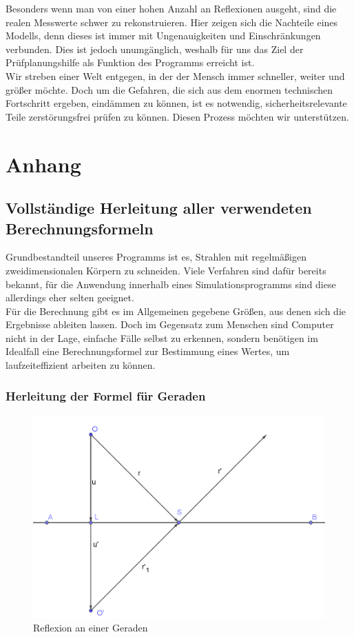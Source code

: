 \documentclass[reducespace,stylepage,semiarbeit]{spezidoc}
\begin{document}
Besonders wenn man von einer hohen Anzahl an Reflexionen ausgeht, sind die realen Messwerte schwer zu rekonstruieren.
Hier zeigen sich die Nachteile eines Modells, denn dieses ist immer mit Ungenauigkeiten und Einschränkungen verbunden.
Dies ist jedoch unumgänglich, weshalb für uns das Ziel der Prüfplanungshilfe als Funktion des Programms erreicht ist.\\ %
Wir streben einer Welt entgegen, in der der Mensch immer schneller, weiter und größer möchte. 
Doch um die Gefahren, die sich aus dem enormen technischen Fortschritt ergeben, eindämmen zu können, ist es notwendig, sicherheitsrelevante Teile zerstörungsfrei prüfen zu können.
Diesen Prozess möchten wir unterstützen.\\ %


\newpage
\section{Anhang}

\subsection{Vollständige Herleitung aller verwendeten Berechnungsformeln} \label{sec:AnhangHerlFormel}
Grundbestandteil unseres Programms ist es, Strahlen mit regelmäßigen zweidimensionalen Körpern zu schneiden. 
Viele Verfahren sind dafür bereits bekannt, für die Anwendung innerhalb eines Simulationsprogramms sind diese allerdings eher selten geeignet.\\
Für die Berechnung gibt es im Allgemeinen gegebene Größen, aus denen sich die Ergebnisse ableiten lassen. Doch im Gegensatz zum Menschen sind Computer nicht in der Lage, einfache Fälle selbst zu erkennen, sondern benötigen im Idealfall eine Berechnungsformel zur Bestimmung eines Wertes, um laufzeiteffizient arbeiten zu können.

\subsubsection*{Herleitung der Formel für Geraden}

\begin{figure}[h]
\centering
\includegraphics[scale=0.5]{pictures/LineRef.png}
\caption{Reflexion an einer Geraden}
\end{figure}
\end{document}
